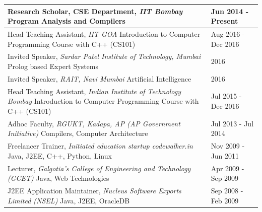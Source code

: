 \documentclass[a4paper,12pt]{article}
\begin{document}
\begin{flushleft}
\begin{tabular}{ m{}| R{0.25\textwidth}}
    \rule[3ex]{0ex}{0ex}Research Scholar, CSE Department, \textit{IIT Bombay} \newline{}Program Analysis and Compilers & Jun 2014 - Present\\ \hline

    \rule[3ex]{0ex}{0ex}Head Teaching Assistant, \textit{IIT GOA} \newline{}Introduction to Computer Programming Course with C++ (CS101) & Aug 2016 - Dec 2016\\ \hline

    \rule[3ex]{0ex}{0ex}Invited Speaker, \textit{Sardar Patel Institute of Technology, Mumbai} \newline{}Prolog based Expert Systems & 2016\\ \hline

    \rule[3ex]{0ex}{0ex}Invited Speaker, \textit{RAIT, Navi Mumbai} \newline{}Artificial Intelligence & 2016\\ \hline

    \rule[3ex]{0ex}{0ex}Head Teaching Assistant, \textit{Indian Institute of Technology Bombay} \newline{}Introduction to Computer Programming Course with C++ (CS101) & Jul 2015 - Dec 2016\\ \hline

    \rule[3ex]{0ex}{0ex}Adhoc Faculty, \textit{RGUKT, Kadapa, AP (AP Government Initiative)} \newline{}Compilers, Computer Architecture& Jul 2013 - Jul 2014\\ \hline

    \rule[3ex]{0ex}{0ex}Freelancer Trainer, \textit{Initiated education startup codewalker.in} \newline{}Java, J2EE, C++, Python, Linux& Nov 2009 - Jun 2011\\ \hline 

    \rule[3ex]{0ex}{0ex}Lecturer, \textit{Galgotia's College of Engineering and Technology (GCET)} \newline{}Java, Web Technologies& Apr 2009 - Sep 2009\\ \hline 

    \rule[3ex]{0ex}{0ex}J2EE Application Maintainer, \textit{Nucleus Software Exports Limited (NSEL)} \newline{}Java, J2EE, OracleDB& Sep 2008 - Feb 2009\\ \hline 
\end{tabular}


\end{flushleft}
\end{document}

